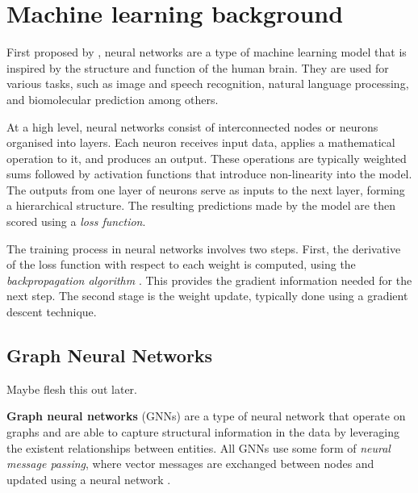 \section{Machine learning background}
First proposed by \citet{rosenblatt1958}, neural networks are a type of machine learning model that is inspired by the structure and function of the human brain. 
They are used for various tasks, such as image and speech recognition, natural language processing, and biomolecular prediction among others.

At a high level, neural networks consist of interconnected nodes or neurons organised into layers. Each neuron receives input data, applies a mathematical operation to it, and produces an output. These operations are typically weighted sums followed by activation functions that introduce non-linearity into the model. 
The outputs from one layer of neurons serve as inputs to the next layer, forming a hierarchical structure. The resulting predictions made by the model are then scored using a \textit{loss function}.

The training process in neural networks involves two steps. First, the derivative of the loss function with respect to each weight is computed, using the \textit{backpropagation algorithm} \citep{backpropagation1}. This provides the gradient information needed for the next step. The second stage is the weight update, typically done using a gradient descent technique. 

\subsection{Graph Neural Networks}
{\color{blue}Maybe flesh this out later.}

\textbf{Graph neural networks} (GNNs) are a type of neural network that operate on graphs and are able to capture structural information in the data by leveraging the existent relationships between entities. 
All GNNs use some form of \textit{neural message passing}, where vector messages are exchanged between nodes and updated using a neural network \citep{gilmer2017neural}.

